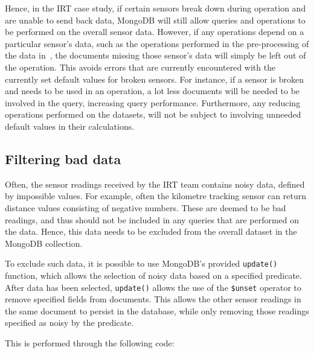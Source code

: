 \documentclass[a4paper,11pt]{article}
\begin{document}
Hence, in the IRT case study, if certain sensors break down during operation and are unable to send back data, MongoDB
will still allow queries and operations to be performed on the overall sensor data. However, if any operations depend on
a particular sensor's data, such as the operations performed in the pre-processing of the data
in~, the documents missing those sensor's data will simply be left out of the operation. This
avoids errors that are currently encountered with the currently set default values for broken sensors. For instance, if
a sensor is broken and needs to be used in an operation, a lot less documents will be needed to be involved in the
query, increasing query performance. Furthermore, any reducing operations performed on the datasets, will not be subject
to involving unneeded default values in their calculations.



\subsection{Filtering bad data} %
\label{sub:filtering_bad_data}

Often, the sensor readings received by the IRT team contains noisy data, defined by impossible values. For example, often
the kilometre tracking sensor can return distance values consisting of negative numbers. These are deemed to be bad
readings, and thus should not be included in any queries that are performed on the data. Hence, this data needs to be
excluded from the overall dataset in the MongoDB collection.

To exclude such data, it is possible to use MongoDB's provided \texttt{update()} function, which allows the selection
of noisy data based on a specified predicate. After data has been selected, \texttt{update()} allows the use of the
\texttt{\$unset} operator to remove specified fields from documents. This allows the other sensor readings in the same
document to persist in the database, while only removing those readings specified as noisy by the predicate.

This is performed through the following code:
\end{document}
